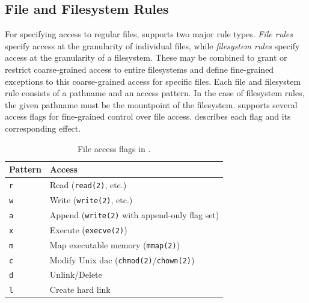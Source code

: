 \subsection{File and Filesystem Rules}


For specifying access to regular files, \bpfcontain{} supports two major rule types.
\textit{File rules} specify access at the granularity of individual files, while
\textit{filesystem rules} specify access at the granularity of a filesystem.  These may be
combined to grant or restrict coarse-grained access to entire filesystems and define
fine-grained exceptions to this coarse-grained access for specific files. Each file and
filesystem rule consists of a pathname and an access pattern. In the case of filesystem
rules, the given pathname must be the mountpoint of the filesystem. \bpfcontain{} supports
several access flags for fine-grained control over file access.
 describes each flag and its corresponding effect.

\begin{table}[htbp]
  \centering
  \caption[File access flags in \bpfcontain{}]{
    File access flags in \bpfcontain{}.
  }%
  \label{tab:bpfcontain-file-access}
  \begin{tabular}{ll}
  \toprule
  Pattern & Access \\
  \midrule
  \texttt{r} & Read (\texttt{read(2)}, etc.) \\
  \texttt{w} & Write (\texttt{write(2)}, etc.)\\
  \texttt{a} & Append (\texttt{write(2)} with append-only flag set) \\
  \texttt{x} & Execute (\texttt{execve(2)})\\
  \texttt{m} & Map executable memory (\texttt{mmap(2)}) \\
  \texttt{c} & Modify Unix \gls{dac} (\texttt{chmod(2)}/\texttt{chown(2)}) \\
  \texttt{d} & Unlink/Delete \\
  \texttt{l} & Create hard link \\
  \bottomrule
  \end{tabular}
\end{table}

